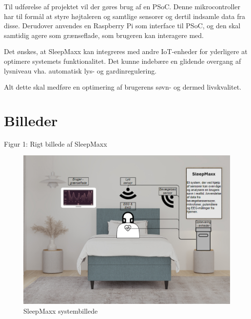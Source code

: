 \documentclass[a4paper,12pt]{article}
\begin{document}
Til udførelse af projektet vil der gøres brug af en PSoC. Denne mikrocontroller har til formål at styre højtaleren og samtlige sensorer og dertil indsamle data fra disse. Derudover anvendes en Raspberry Pi som interface til PSoC, og den skal samtidig agere som grænseflade, som brugeren kan interagere med.

Det ønskes, at SleepMaxx kan integreres med andre IoT-enheder for yderligere at optimere systemets funktionalitet. Det kunne indebære en glidende overgang af lysniveau vha. automatisk lys- og gardinregulering. 

Alt dette skal medføre en optimering af brugerens søvn- og dermed livskvalitet.

\section{Billeder}
Figur 1: Rigt billede af SleepMaxx

\begin{figure}[h!]
    \centering
    \includegraphics[width=1\textwidth]{SleepMaxx_image.png}
    \caption{SleepMaxx systembillede}
    \label{fig:sleepmaxx}
\end{figure}
\end{document}
